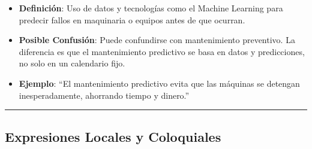 \documentclass[
  10pt,
  letterpaper,
]{book}
\providecommand{\tightlist}{%
  \setlength{\itemsep}{0pt}\setlength{\parskip}{0pt}}\usepackage{longtable,booktabs,array}
\begin{document}
\begin{enumerate}
  \begin{itemize}
  \tightlist
  \item
    \textbf{Definición}: Uso de datos y tecnologías como el Machine
    Learning para predecir fallos en maquinaria o equipos antes de que
    ocurran.
  \item
    \textbf{Posible Confusión}: Puede confundirse con mantenimiento
    preventivo. La diferencia es que el mantenimiento predictivo se basa
    en datos y predicciones, no solo en un calendario fijo.
  \item
    \textbf{Ejemplo}: ``El mantenimiento predictivo evita que las
    máquinas se detengan inesperadamente, ahorrando tiempo y dinero.''
  \end{itemize}
\end{enumerate}

\begin{center}\rule{0.5\linewidth}{0.5pt}\end{center}

\subsection{\texorpdfstring{\textbf{Expresiones Locales y
Coloquiales}}{Expresiones Locales y Coloquiales}}\label{expresiones-locales-y-coloquiales}
\end{document}
